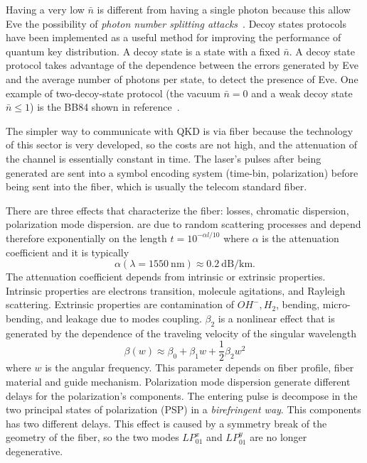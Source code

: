 Having a very low $\bar{n}$ is different from having a single photon because this allow Eve the possibility of \textit{photon number splitting attacks}~\cite{a24}.
Decoy states protocols have been implemented as a useful method for improving the performance of quantum key distribution. A decoy state is a state with a fixed $\bar{n}$. A decoy state protocol takes advantage of the dependence between the errors generated by Eve and the average number of photons per state, to detect the presence of Eve.
One example of two-decoy-state protocol (the vacuum $\bar{n} = 0$ and a weak decoy state $\bar{n} \le 1$) is the BB84 shown in reference~\cite{b24}.


The simpler way to communicate with QKD is via fiber because the technology of this sector is very developed, so the costs are not high, and the attenuation of the channel is essentially constant in time. The laser's pulses after being generated are sent into a symbol encoding system (time-bin, polarization) before being sent into the fiber, which is usually the telecom standard fiber.

There are three effects that characterize the fiber: losses, chromatic dispersion, polarization mode dispersion.  are due to random scattering processes and depend therefore exponentially on the length $t = 10^{-\alpha l / 10}$ where $\alpha$ is the attenuation coefficient and it is typically
\begin{equation}
  \alpha(\lambda = 1550~\mbox{nm}) \approx 0.2~\mbox{dB/km}.
\end{equation}
The attenuation coefficient depends from intrinsic or extrinsic properties. Intrinsic properties are electrons transition, molecule agitations, and Rayleigh scattering. Extrinsic properties are contamination of $OH^-, H_2$, bending, micro-bending, and leakage due to modes coupling.  $\beta_2$ is a nonlinear effect that is generated by the dependence of the traveling velocity of the singular wavelength
\begin{equation}
  \beta(w) \approx \beta_0 + \beta_1 w + \frac{1}{2} \beta_2 w^2
\end{equation}
where $w$ is the angular frequency. This parameter depends on fiber profile, fiber material and guide mechanism. Polarization mode dispersion  generate different delays for the polarization's components. The entering pulse is decompose in the two principal states of polarization (PSP) in a \textit{birefringent way}. This components has two different delays. This effect is caused by a symmetry break of the geometry of the fiber, so the two modes $LP_{01}^x$ and $LP_{01}^y$ are no longer degenerative.

